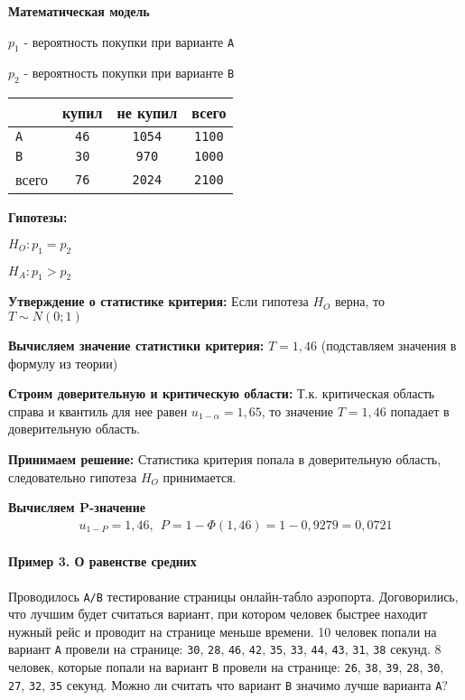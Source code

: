 \documentclass[12pt]{extarticle}
\begin{document}
\par\textbf{Математическая модель}
\begin{description}
    \item $p_{1}$ - вероятность покупки при варианте \verb|A|
    \item $p_{2}$ - вероятность покупки при варианте \verb|B|
\end{description}
\begin{center}\begin{tabular}{l|c|c|c}
& купил & не купил & всего \\\hline
    \verb|A| & \verb|46| & \verb|1054| & \verb|1100| \\\hline
    \verb|B| & \verb|30| & \verb|970| & \verb|1000| \\\hline
    всего & \verb|76| & \verb|2024| & \verb|2100|
\end{tabular} \end{center}

\par\textbf{Гипотезы:}
\begin{description}
    \item $H_{O}: p_{1}=p_{2}$
    \item $H_{A}: p_{1}>p_{2}$
\end{description}

\par\textbf{Утверждение о статистике критерия:} Если гипотеза $H_{O}$
верна, то $T\sim N(0;1)$

\par\textbf{Вычисляем значение статистики критерия:} $T=1,46$
(подставляем значения в формулу из теории)

\par\textbf{Строим доверительную и критическую области:} Т.к.
критическая область справа и квантиль для нее равен $u_{1-\alpha}=1,65$,
то значение $T=1,46$ попадает в доверительную область. 

\par \textbf{Принимаем решение:} Статистика критерия попала в
доверительную область, следовательно гипотеза $H_{O}$ принимается.

\par\textbf{Вычисляем P-значение}
\begin{eqnarray*}
    u_{1-P}=1,46
    ,\ \ P=1-\Phi(1,46)=1-0,9279=0,0721
\end{eqnarray*}

\paragraph{Пример 3. О равенстве средних}
Проводилось \verb|A/B| тестирование страницы онлайн-табло аэропорта.
Договорились, что лучшим будет считаться вариант, при котором человек
быстрее находит нужный рейс и проводит на странице меньше времени. 10
человек попали на вариант \verb|A| провели на странице: \verb|30|,
\verb|28|, \verb|46|, \verb|42|, \verb|35|, \verb|33|, \verb|44|,
\verb|43|, \verb|31|, \verb|38| секунд. 8 человек, которые попали на
вариант \verb|B| провели на странице: \verb|26|, \verb|38|, \verb|39|,
\verb|28|, \verb|30|, \verb|27|, \verb|32|, \verb|35| секунд. Можно ли
считать что вариант \verb|B| значимо лучше варианта \verb|A|?
\end{document}
